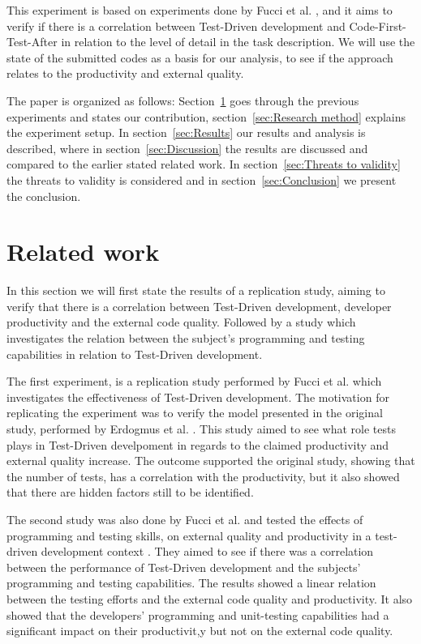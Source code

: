 \documentclass{sig-alternate-05-2015}
\begin{document}
This experiment is based on experiments done by Fucci et al. \cite{fucci2}, and it aims to verify if there is a correlation between Test-Driven development and Code-First-Test-After in relation to the level of detail in the task description. We will use the state of the submitted codes as a basis for our analysis, to see if the approach relates to the productivity and external quality.

The paper is organized as follows: Section~\ref{sec:Related work} goes through the previous experiments and states our contribution, section~\ref{sec:Research method} explains the experiment setup. In section~\ref{sec:Results} our results and analysis is described, where in section~\ref{sec:Discussion} the results are discussed and compared to the earlier stated related work. In section~\ref{sec:Threats to validity} the threats to validity is considered and in section~\ref{sec:Conclusion} we present the conclusion. 

\section{Related work}
\label{sec:Related work}
In this section we will first state the results of a replication study, aiming to verify that there is a correlation between Test-Driven development, developer productivity and the external code quality. Followed by a study which investigates the relation between the subject's programming and testing capabilities in relation to Test-Driven development.

The first experiment, is a replication study performed by Fucci et al. \cite{fucci2} which investigates the effectiveness of Test-Driven development. The motivation for replicating the experiment was to verify the model presented in the original study, performed by Erdogmus et al. \cite{erdogmus1}. This study aimed to see what role tests plays in Test-Driven develpoment in regards to the claimed productivity and external quality increase. The outcome supported the original study, showing that the number of tests, has a correlation with the productivity, but it also showed that there are hidden factors still to be identified.

The second study was also done by Fucci et al. and tested the effects of programming and testing skills, on external quality and productivity in a test-driven development context \cite{fucci1}. They aimed to see if there was a correlation between the performance of Test-Driven development and the subjects' programming and testing capabilities. The results showed a linear relation between the testing efforts and the external code quality and productivity. It also showed that the developers' programming and unit-testing capabilities had a significant impact on their productivit,y but not on the external code quality.
\end{document}
